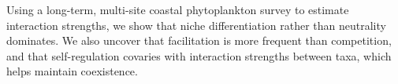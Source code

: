 \documentclass[english]{article}
\begin{document}
Using a long-term, multi-site coastal phytoplankton survey to estimate interaction strengths, we show that niche differentiation rather than neutrality dominates. We also uncover that facilitation is more frequent than competition, and that self-regulation covaries with interaction strengths between taxa, which helps maintain coexistence.
\end{document}
